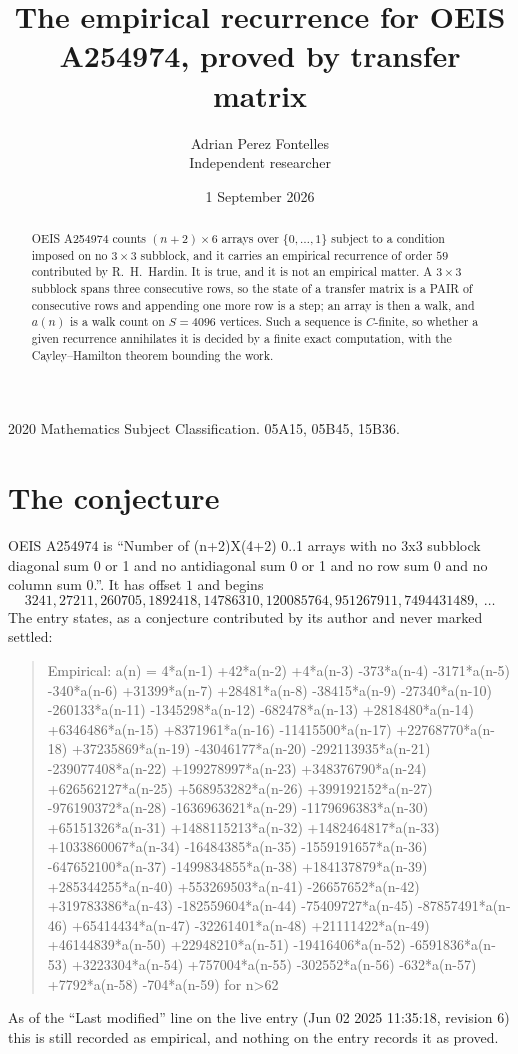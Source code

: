 \documentclass[11pt,a4paper]{article}
\title{The empirical recurrence for OEIS A254974, proved by transfer matrix}
\author{Adrian Perez Fontelles\\ \small Independent researcher}
\date{1 September 2026}
\theoremstyle{plain}
\theoremstyle{definition}
\begin{document}
\maketitle

\begin{abstract}
OEIS A254974 counts $(n+2)\times6$ arrays over $\{0,\dots,1\}$ subject to a condition imposed on
no $3\times3$ subblock, and it carries an empirical recurrence of order $59$
contributed by R.~H.~Hardin. It is true, and it is not an empirical matter. A $3\times3$
subblock spans three consecutive rows, so the state of a transfer matrix is a PAIR of
consecutive rows and appending one more row is a step; an array is then a walk, and
$a(n)$ is a walk count on $S=4096$ vertices. Such a sequence is $C$-finite, so whether a given
recurrence annihilates it is decided by a finite exact computation, with the Cayley--Hamilton
theorem bounding the work.
\end{abstract}

\noindent\small 2020 Mathematics Subject Classification. 05A15, 05B45, 15B36.\normalsize

\section{The conjecture}

OEIS A254974 is ``Number of (n+2)X(4+2) 0..1 arrays with no 3x3 subblock diagonal sum 0 or 1 and no antidiagonal sum 0 or 1 and no row sum 0 and no column sum 0.''. It has offset $1$ and begins
\[
3241, 27211, 260705, 1892418, 14786310, 120085764, 951267911, 7494431489,\ \dots
\]
The entry states, as a conjecture contributed by its author and never marked settled:
\begin{quote}
Empirical: a(n) = 4*a(n-1) +42*a(n-2) +4*a(n-3) -373*a(n-4) -3171*a(n-5) -340*a(n-6) +31399*a(n-7) +28481*a(n-8) -38415*a(n-9) -27340*a(n-10) -260133*a(n-11) -1345298*a(n-12) -682478*a(n-13) +2818480*a(n-14) +6346486*a(n-15) +8371961*a(n-16) -11415500*a(n-17) +22768770*a(n-18) +37235869*a(n-19) -43046177*a(n-20) -292113935*a(n-21) -239077408*a(n-22) +199278997*a(n-23) +348376790*a(n-24) +626562127*a(n-25) +568953282*a(n-26) +399192152*a(n-27) -976190372*a(n-28) -1636963621*a(n-29) -1179696383*a(n-30) +65151326*a(n-31) +1488115213*a(n-32) +1482464817*a(n-33) +1033860067*a(n-34) -16484385*a(n-35) -1559191657*a(n-36) -647652100*a(n-37) -1499834855*a(n-38) +184137879*a(n-39) +285344255*a(n-40) +553269503*a(n-41) -26657652*a(n-42) +319783386*a(n-43) -182559604*a(n-44) -75409727*a(n-45) -87857491*a(n-46) +65414434*a(n-47) -32261401*a(n-48) +21111422*a(n-49) +46144839*a(n-50) +22948210*a(n-51) -19416406*a(n-52) -6591836*a(n-53) +3223304*a(n-54) +757004*a(n-55) -302552*a(n-56) -632*a(n-57) +7792*a(n-58) -704*a(n-59) for n>62
\end{quote}
As of the ``Last modified'' line on the live entry (Jun 02 2025 11:35:18, revision 6) this is still
recorded as empirical, and nothing on the entry records it as proved.
\end{document}
